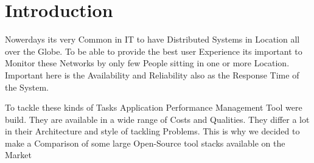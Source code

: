 
\chapter{Introduction}
Nowerdays its very Common in IT to have Distributed Systems in Location all over the Globe. To be able to provide the best user Experience its important to Monitor these Networks by only few People sitting in one or more Location. Important here is the Availability and Reliability also as the Response Time of the System. 

To tackle these kinds of Tasks Application Performance Management Tool were build. They are available in a wide range of Costs and Qualities. They differ a lot in their Architecture and style of tackling Problems. This is why we decided to make a Comparison of some large Open-Source tool stacks available on the Market 


